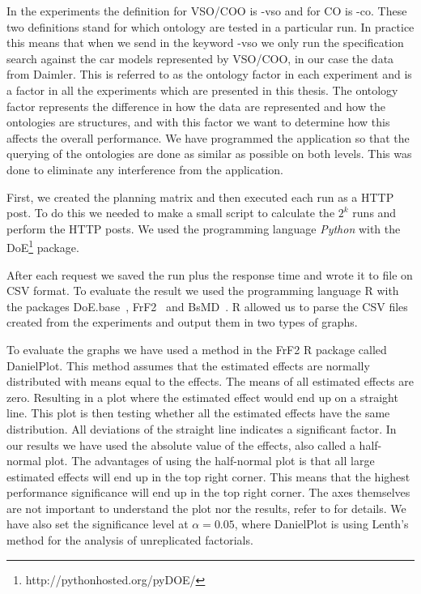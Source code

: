 \documentclass{llncs}
\begin{document}
In the experiments the definition for VSO/COO is \textsf{-vso} and for
CO is \textsf{-co}.  These two definitions stand for which ontology
are tested in a particular run. In practice this means that when we
send in the keyword \textsf{-vso} we only run the specification search
against the car models represented by VSO/COO, in our case the data
from Daimler. This is referred to as the ontology factor in each
experiment and is a factor in all the experiments which are presented
in this thesis. The ontology factor represents the difference in how
the data are represented and how the ontologies are structures, and
with this factor we want to determine how this affects the overall
performance.  We have programmed the application so that the querying
of the ontologies are done as similar as possible on both levels. This
was done to eliminate any interference from the application.

First, we created the planning matrix and then executed each run as a
HTTP post. To do this we needed to make a small script to calculate
the $2^k$ runs and perform the HTTP posts. We used the programming
language \emph{Python} with the
DoE\footnote{http://pythonhosted.org/pyDOE/} package.

After each request we saved the run plus
the response time and wrote it to file on CSV format. To evaluate the
result we used the programming language R with the packages
\textsf{DoE.base}~\cite{DoEBase}, \textsf{FrF2}~\cite{FrF2} and
\textsf{BsMD}~\cite{BsMD}. R allowed us to parse the CSV files created
from the experiments and output them in two types of graphs.  

To evaluate the graphs we have used a method in the \textsf{FrF2} R
package called \textsf{DanielPlot}. This method assumes that the
estimated effects are normally distributed with means equal to the
effects. The means of all estimated effects are zero. Resulting in a
plot where the estimated effect would end up on a straight line. This
plot is then testing whether all the estimated effects have the same
distribution. All deviations of the straight line indicates a
significant factor. In our results we have used the absolute value of
the effects, also called a half-normal plot. The advantages of using
the half-normal plot is that all large estimated effects will end up
in the top right corner. This means that the highest performance
significance will end up in the top right corner. The
axes themselves are not important to understand the plot nor the
results, refer to \cite{PlanExp} for details.
We have also set  the significance level at $\alpha =
0.05$, where \textsf{DanielPlot} is using Lenth's method for the
analysis of unreplicated factorials.
\end{document}
